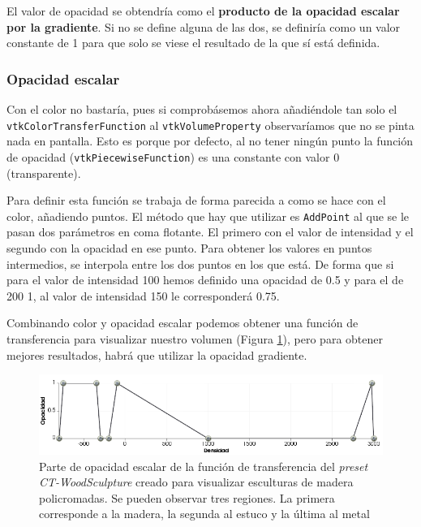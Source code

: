 El valor de opacidad se obtendría como el \textbf{producto de la opacidad escalar por la gradiente}. Si no se define alguna de las dos, se definiría como un valor constante de 1 para que solo se viese el resultado de la que sí está definida.

\subsubsection{Opacidad escalar}

Con el color no bastaría, pues si comprobásemos ahora añadiéndole tan solo el \texttt{vtkColorTransferFunction} al \texttt{vtkVolumeProperty} observaríamos que no se pinta nada en pantalla. Esto es porque por defecto, al no tener ningún punto la función de opacidad (\texttt{vtkPiecewiseFunction}) es una constante con valor 0 (transparente). 

Para definir esta función se trabaja de forma parecida a como se hace con el color, añadiendo puntos. El método que hay que utilizar es \texttt{AddPoint} al que se le pasan dos parámetros en coma flotante. El primero con el valor de intensidad y el segundo con la opacidad en ese punto. Para obtener los valores en puntos intermedios, se interpola entre los dos puntos en los que está. De forma que si para el valor de intensidad 100 hemos definido una opacidad de 0.5 y para el de 200 1, al valor de intensidad 150 le corresponderá 0.75.

Combinando color y opacidad escalar podemos obtener una función de transferencia para visualizar nuestro volumen (Figura \ref{fig:opacity_tf}), pero para obtener mejores resultados, habrá que utilizar la opacidad gradiente. 

\begin{figure}[H]
	\centering
	\includegraphics[width=12.5cm]{imagenes/opacity_tf}
	\caption{Parte de opacidad escalar de la función de transferencia del \textit{preset} \textit{CT-WoodSculpture} creado para visualizar esculturas de madera policromadas. Se pueden observar tres regiones. La primera corresponde a la madera, la segunda al estuco y la última al metal}
	\label{fig:opacity_tf}
\end{figure}


